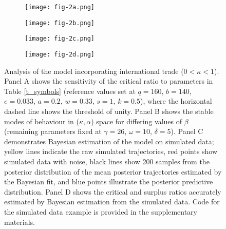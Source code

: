 \documentclass[12pt]{article}
\begin{document}
\begin{figure}[t]
  \centering
  \begin{subfigure}{\textwidth}
      \centering
      \caption{}
      \hspace{0em}
      \texttt{[image: fig-2a.png]}
      \label{fig:2a}
  \end{subfigure}%

  \begin{subfigure}{\textwidth}
      \centering
      \caption{}
      \hspace{0em}
      \texttt{[image: fig-2b.png]}
      \label{fig:2b}
  \end{subfigure}%

  \begin{subfigure}{\textwidth}
      \centering
      \caption{}
      \hspace{0em} 
      \texttt{[image: fig-2c.png]}
      \label{fig:2c}
  \end{subfigure}%
  
  \begin{subfigure}{\textwidth}
      \centering
      \caption{}
      \hspace{0em}
      \texttt{[image: fig-2d.png]}
      \label{fig:2d}
  \end{subfigure}%

  \caption{
      Analysis of the model incorporating international trade ($0 < \kappa < 1$). 
      Panel A shows the sensitivity of the critical ratio to parameters in Table \ref{t_symbols} (reference values set at $q = 160$, $b = 140$, $e = 0.033$, $a = 0.2$, $w = 0.33$, $s=1$, $k=0.5$), where the horizontal dashed line shows the threshold of unity. Panel B shows the stable modes of behaviour in ($\kappa, \alpha$) space for differing values of $\beta$ (remaining parameters fixed at $\gamma = 26$, $\omega = 10$, $\delta = 5$). Panel C demonstrates Bayesian estimation of the model on simulated data; yellow lines indicate the raw simulated trajectories, red points show simulated data with noise, black lines show 200 samples from the posterior distribution of the mean posterior trajectories estimated by the Bayesian fit, and blue points illustrate the posterior predictive distribution.   
 Panel D shows the critical and surplus ratios accurately estimated by Bayesian estimation from the simulated data. Code for the simulated data example is provided in the supplementary materials.
 }
  \label{figure2}
\end{figure}
\end{document}
